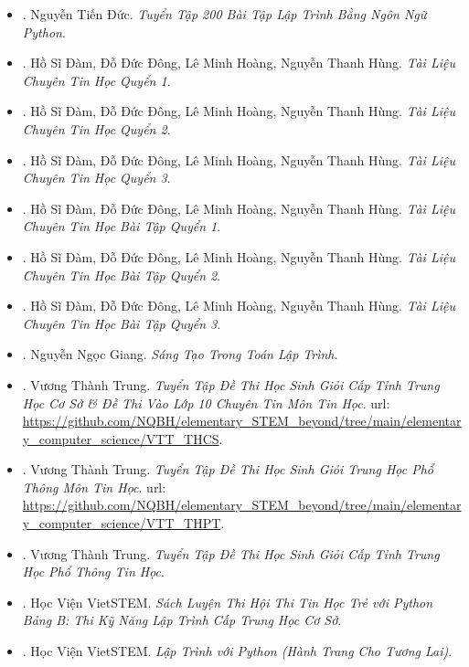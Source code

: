 \documentclass[12pt]{article}
\begin{document}
\begin{itemize}
	\item \cite{Duc_200_BT_Python}. {\sc Nguyễn Tiến Đức}. {\it Tuyển Tập 200 Bài Tập Lập Trình Bằng Ngôn Ngữ Python}.
	\item \cite{TL_chuyen_Tin_quyen_1}. {\sc Hồ Sĩ Đàm, Đỗ Đức Đông, Lê Minh Hoàng, Nguyễn Thanh Hùng}. {\it Tài Liệu Chuyên Tin Học Quyển 1}.
	\item \cite{TL_chuyen_Tin_quyen_2}. {\sc Hồ Sĩ Đàm, Đỗ Đức Đông, Lê Minh Hoàng, Nguyễn Thanh Hùng}. {\it Tài Liệu Chuyên Tin Học Quyển 2}.
	\item \cite{TL_chuyen_Tin_quyen_3}. {\sc Hồ Sĩ Đàm, Đỗ Đức Đông, Lê Minh Hoàng, Nguyễn Thanh Hùng}. {\it Tài Liệu Chuyên Tin Học Quyển 3}.
	\item \cite{TL_chuyen_Tin_BT_quyen_1}. {\sc Hồ Sĩ Đàm, Đỗ Đức Đông, Lê Minh Hoàng, Nguyễn Thanh Hùng}. {\it Tài Liệu Chuyên Tin Học Bài Tập Quyển 1}.
	\item \cite{TL_chuyen_Tin_BT_quyen_2}. {\sc Hồ Sĩ Đàm, Đỗ Đức Đông, Lê Minh Hoàng, Nguyễn Thanh Hùng}. {\it Tài Liệu Chuyên Tin Học Bài Tập Quyển 2}.
	\item \cite{TL_chuyen_Tin_BT_quyen_3}. {\sc Hồ Sĩ Đàm, Đỗ Đức Đông, Lê Minh Hoàng, Nguyễn Thanh Hùng}. {\it Tài Liệu Chuyên Tin Học Bài Tập Quyển 3}.
	\item \cite{Giang_sang_tao_lap_trinh}. {\sc Nguyễn Ngọc Giang}. {\it Sáng Tạo Trong Toán Lập Trình}.
	\item \cite{Trung_THCS_Tin}. {\sc Vương Thành Trung}. {\it Tuyển Tập Đề Thi Học Sinh Giỏi Cấp Tỉnh Trung Học Cơ Sở \& Đề Thi Vào Lớp 10 Chuyên Tin Môn Tin Học}. {\sc url}: \url{https://github.com/NQBH/elementary_STEM_beyond/tree/main/elementary_computer_science/VTT_THCS}.
	\item \cite{Trung_THPT_Tin}. {\sc Vương Thành Trung}. {\it Tuyển Tập Đề Thi Học Sinh Giỏi Trung Học Phổ Thông Môn Tin Học}. {\sc url}: \url{https://github.com/NQBH/elementary_STEM_beyond/tree/main/elementary_computer_science/VTT_THPT}.
	\item \cite{Trung_HSG_THPT_Tin}. {\sc Vương Thành Trung}. {\it Tuyển Tập Đề Thi Học Sinh Giỏi Cấp Tỉnh Trung Học Phổ Thông Tin Học}.
	\item \cite{VietSTEM2021}. {\sc Học Viện VietSTEM}. {\it Sách Luyện Thi Hội Thi Tin Học Trẻ  với Python Bảng B: Thi Kỹ Năng Lập Trình Cấp Trung Học Cơ Sở}.
	\item \cite{VietSTEM2022}. {\sc Học Viện VietSTEM}. {\it Lập Trình với Python (Hành Trang Cho Tương Lai)}.\hfill{\sf[done]}
\end{itemize}
\end{document}
